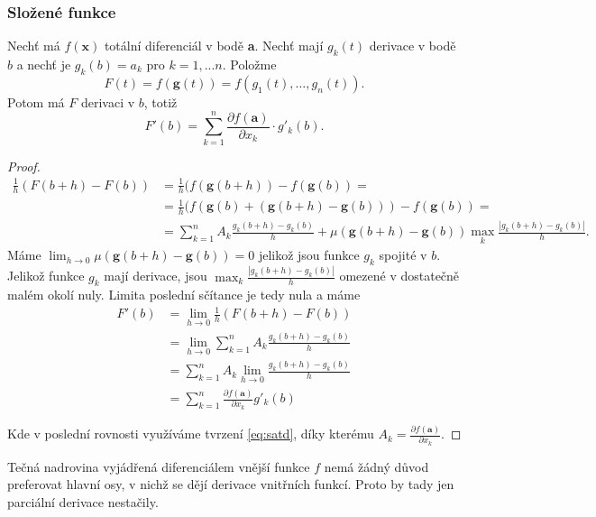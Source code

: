 \documentclass[../main.tex]{subfiles}
\begin{document}
\subsubsection{Složené funkce}
\begin{theorem}\label{th:dsf}
	Nechť má $f(\textbf{x})$ totální diferenciál v bodě \textbf{a}. Nechť mají $g_k(t)$ derivace v bodě $b$ a nechť je $g_k(b) = a_k$ pro 
	$k = 1,...n.$ Položme
	\[F(t) = f(\textbf{g}(t)) = f(g_1(t),...,g_n(t)).\]
	Potom má $F$ derivaci v $b$, totiž 
	\[F'(b) = \sum^n_{k=1}\frac{\partial f(\textbf{a})}{\partial x_k} \cdot g'_k(b).\]
\end{theorem}

\begin{proof}
	\begin{align*} 
	 \frac{1}{h} (F(b+h) - F(b)) &= \frac{1}{h}(f(\textbf{g}(b+h)) - f(\textbf{g}(b)) =  \\
	 &=\frac{1}{h}(f(\textbf{g}(b) + (\textbf{g}(b+h) - \textbf{g}(b))) - f(\textbf{g}(b)) = \\
	 &=\sum^n_{k=1}A_k\frac{g_k(b+h)-g_k(b)}{h} + \mu(\textbf{g}(b+h) - \textbf{g}(b)) \max_k\frac{|g_k(b+h)-g_k(b)|}{h}.
	\end{align*}
	Máme $\lim_{h \rightarrow 0} \mu(\textbf{g}(b+h)-\textbf{g}(b)) = 0$ jelikož jsou funkce $g_k$ spojité v $b$. 
	Jelikož funkce $g_k$ mají derivace, jsou $\max_k \frac{|g_k(b+h) - g_k(b)|}{h}$ omezené v dostatečně malém okolí nuly. Limita 
	poslední sčítance je tedy nula a máme
	\[
		\begin{aligned}
			F'(b) &= \lim_{h \rightarrow 0} \frac{1}{h}(F(b+h) - F(b)) \\
			&= \lim_{h \rightarrow 0} \sum^n_{k = 1} A_k\frac{g_k(b+h)-g_k(b)}{h} \\
			&= \sum^n_{k = 1}A_k\lim_{h \rightarrow 0} \frac{g_k(b+h) - g_k(b)}{h} \\
			&= \sum^n_{k = 1}\frac{\partial f(\textbf{a})}{\partial x_k}g'_k(b)
		\end{aligned}
	\]

	Kde v poslední rovnosti využíváme tvrzení \ref{eq:satd}, díky kterému $A_k = \frac{\partial f(\textbf{a})}{\partial x_k}$.
\end{proof}

\begin{intuition}
	Tečná nadrovina vyjádřená diferenciálem vnější funkce $f$ nemá žádný důvod preferovat hlavní osy, v nichž se 
	dějí derivace vnitřních funkcí. Proto by tady jen parciální derivace nestačily.
\end{intuition}
\end{document}
